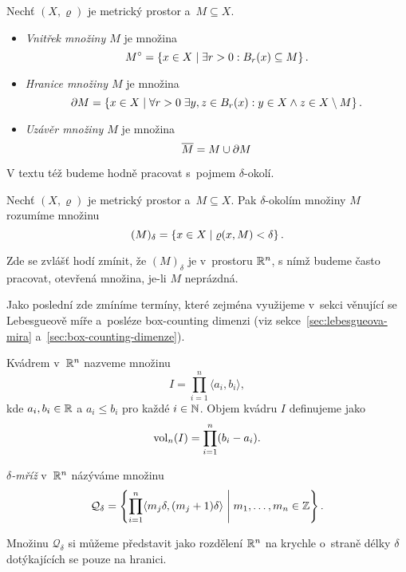 \begin{definition}\label{def:vnitrek-hranice-uzaver}
    Nechť $(X,\varrho)$ je metrický prostor a~$M\subseteq X$.
    \begin{itemize}
        \item \emph{Vnitřek množiny $M$} je množina
        \[M^\circ=\left\{x\in X\mid \exists r>0: B_r(x)\subseteq M\right\}.\]
        \item \emph{Hranice množiny $M$} je množina
        \[\partial M=\left\{x\in X\mid \forall r>0\;\exists y,z\in B_r(x): y\in X\land z\in X\setminus M\right\}.\]
        \item \emph{Uzávěr množiny $M$} je množina
        \[\overline{M}=M\cup\partial M\]
    \end{itemize}
\end{definition}
V textu též budeme hodně pracovat s~pojmem $\delta$-okolí.
\begin{definition}\label{def:delta-okoli}
    Nechť $(X,\varrho)$ je metrický prostor a~$M\subseteq X$. Pak $\delta$-okolím množiny $M$ rozumíme množinu
    \[(M)_\delta=\left\{x\in X\mid\varrho(x,M)<\delta\right\}.\]
\end{definition}
Zde se zvlášť hodí zmínit, že $(M)_\delta$ je v~prostoru $\mathbb{R}^n$, s nímž budeme často pracovat, otevřená množina, je-li $M$ neprázdná.

Jako poslední zde zmíníme termíny, které zejména využijeme v~sekci věnující se Lebesgueově míře a~posléze box-counting dimenzi (viz sekce~\ref{sec:lebesgueova-mira} a~\ref{sec:box-counting-dimenze}).
\begin{definition}[Kvádr]\label{def:kvadr}
    Kvádrem v~$\mathbb{R}^n$ nazveme množinu
    \[I=\prod_{i=1}^{n}\langle a_i,b_i\rangle,\]
    kde $a_i,b_i\in\mathbb{R}$ a $a_i\leqslant b_i$ pro každé $i\in\mathbb{N}$. Objem kvádru $I$ definujeme jako
    \[\operatorname{vol}_n(I)=\prod_{i=1}^{n}(b_i-a_i).\]
\end{definition}
\begin{definition}\label{def:delta-mriz}
    \emph{$\delta$-mříž} v~$\mathbb{R}^n$ názýváme množinu
    \[\mathcal{Q}_\delta=\left\{\prod_{i=1}^{n}\langle m_j\delta,(m_j+1)\delta\rangle\;\middle|\;m_1,\ldots,m_n\in\mathbb{Z}\right\}.\]
\end{definition}
Množinu $\mathcal{Q}_\delta$ si můžeme představit jako rozdělení $\mathbb{R}^n$ na krychle o~straně délky $\delta$ dotýkajících se pouze na hranici.

